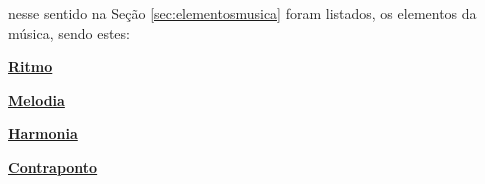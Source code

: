 nesse sentido na Seção \ref{sec:elementosmusica} foram listados,
os elementos da música, sendo estes:
\begin{inparaitem}
\item \hyperref[sec:pos:Ritmo]{\textbf{Ritmo}}
\item \hyperref[sec:pos:Melodia]{\textbf{Melodia}}
\item \hyperref[sec:pos:Harmonia]{\textbf{Harmonia}}
\item \hyperref[sec:pos:Contraponto]{\textbf{Contraponto}}
\end{inparaitem}


